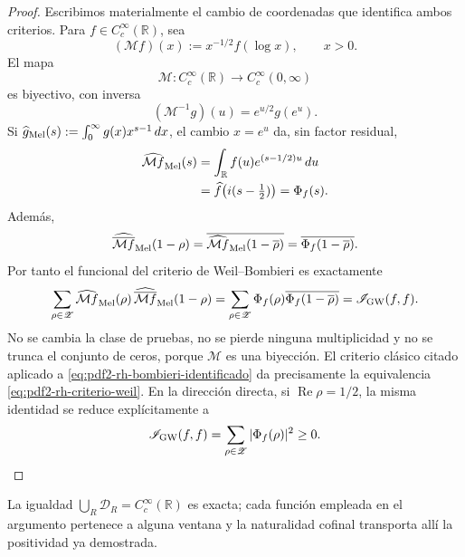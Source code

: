 \begin{proof}
Escribimos materialmente el cambio de coordenadas que identifica ambos
criterios. Para \(f\in C_c^\infty(\mathbb R)\), sea
\begin{equation}\label{eq:pdf2-rh-cambio-mellin}
 (\mathcal M f)(x):=x^{-1/2}f(\log x),
 \qquad x>0.
\end{equation}
El mapa
\[
 \mathcal M:C_c^\infty(\mathbb R)
 \longrightarrow C_c^\infty(0,\infty)
\]
es biyectivo, con inversa
\begin{equation}\label{eq:pdf2-rh-cambio-mellin-inverso}
 (\mathcal M^{-1}g)(u)=e^{u/2}g(e^u).
\end{equation}
Si
\(\widehat g_{\rm Mel}(s):=\int_0^\infty g(x)x^{s-1}\,dx\), el cambio
\(x=e^u\) da, sin factor residual,
\begin{equation}\label{eq:pdf2-rh-mellin-fourier}
 \begin{aligned}
 \widehat{\mathcal M f}_{\rm Mel}(s)
 &=\int_{\mathbb R}f(u)e^{(s-1/2)u}\,du\\
 &=\widehat f\!\left(i(s-\tfrac12)\right)
 =\Phi_f(s).
 \end{aligned}
\end{equation}
Además,
\begin{equation}\label{eq:pdf2-rh-mellin-involucion}
 \widehat{\overline{\mathcal M f}}_{\rm Mel}(1-\rho)
 =\overline{
   \widehat{\mathcal M f}_{\rm Mel}(1-\overline\rho)}
 =\overline{\Phi_f(1-\overline\rho)}.
\end{equation}
Por tanto el funcional del criterio de Weil--Bombieri es exactamente
\begin{equation}\label{eq:pdf2-rh-bombieri-identificado}
 \sum_{\rho\in\mathscr Z}
 \widehat{\mathcal M f}_{\rm Mel}(\rho)\,
 \widehat{\overline{\mathcal M f}}_{\rm Mel}(1-\rho)
 =
 \sum_{\rho\in\mathscr Z}
 \Phi_f(\rho)\overline{\Phi_f(1-\overline\rho)}
 =\mathscr I_{\rm GW}(f,f).
\end{equation}
No se cambia la clase de pruebas, no se pierde ninguna multiplicidad y no se
trunca el conjunto de ceros, porque \(\mathcal M\) es una biyección. El
criterio clásico citado aplicado a
\eqref{eq:pdf2-rh-bombieri-identificado} da precisamente la equivalencia
\eqref{eq:pdf2-rh-criterio-weil}. En la dirección directa, si
\(\operatorname{Re}\rho=1/2\), la misma identidad se reduce explícitamente a
\[
 \mathscr I_{\rm GW}(f,f)
 =\sum_{\rho\in\mathscr Z}|\Phi_f(\rho)|^2\geq0.
\]
\end{proof}

La igualdad \(\bigcup_R\mathcal D_R=C_c^\infty(\mathbb R)\) es exacta; cada
función empleada en el argumento pertenece a alguna ventana y la naturalidad
cofinal transporta allí la positividad ya demostrada.

